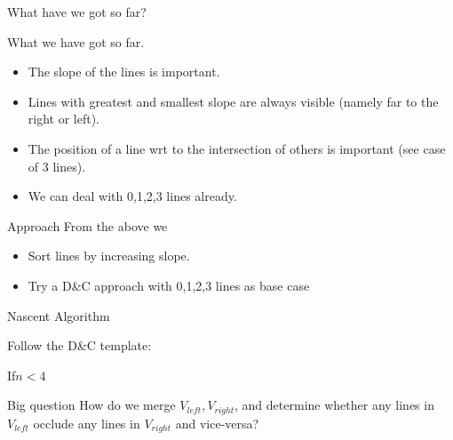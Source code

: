 \documentclass[ignorenonframetext,]{beamer}
\begin{document}
\begin{frame}{What have we got so far?}

  \begin{block}{What we have got so far.}
    \begin{itemize}
    \item The slope of the lines is important.
    \item Lines with greatest and smallest slope are always visible
      (namely far to the right or left).
    \item The position of a line wrt to the intersection of others is
      important (see case of 3 lines).
    \item We can deal with 0,1,2,3 lines already.
    \end{itemize}
  \end{block}
  \pause
  \begin{block}{Approach}
    From the above we
    \begin{itemize}
    \item Sort lines by increasing slope.
    \item Try a D\&C approach with 0,1,2,3 lines as base case
    \end{itemize}
  \end{block}
\end{frame}


\begin{frame}{Nascent Algorithm}
  \footnotesize

  \begin{block}{Follow the D\&C template:}
    \begin{algorithmic}
      If{$n < 4$}
      \EndIf
      \EndProcedure
    \end{algorithmic}
  \end{block}
\pause
  \begin{block}{Big question}
    How do we merge $V_{left}, V_{right}$, and determine whether any
    lines in $V_{left}$ occlude any lines in $V_{right}$ and vice-versa?
  \end{block}
\end{frame}
\end{document}
